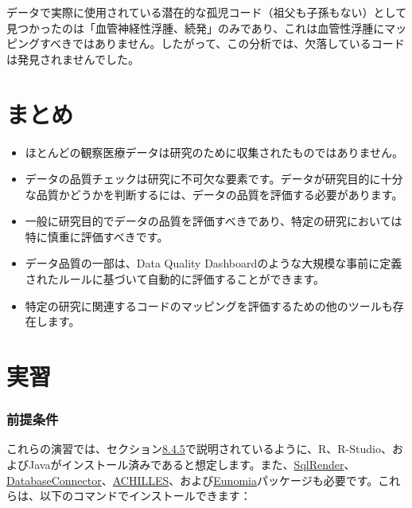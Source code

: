 \documentclass[
  11pt]{book}
\makeatletter
\newenvironment{kframe}{%
\medskip{}
\setlength{\fboxsep}{.8em}
 \def\at@end@of@kframe{}%
 \ifinner\ifhmode%
  \def\at@end@of@kframe{\end{minipage}}%
  \begin{minipage}{\columnwidth}%
 \fi\fi%
 \def\FrameCommand##1{\hskip\@totalleftmargin \hskip-\fboxsep
 \colorbox{myShadeColor}{##1}\hskip-\fboxsep
     \hskip-\linewidth \hskip-\@totalleftmargin \hskip\columnwidth}%
 \MakeFramed {\advance\hsize-\width
   \@totalleftmargin\z@ \linewidth\hsize
   \@setminipage}}%
 {\par\unskip\endMakeFramed%
 \at@end@of@kframe}
\newenvironment{rmdblock}[1]
  {
  \begin{itemize}
  \renewcommand{\labelitemi}{
    \raisebox{-.7\height}[0pt][0pt]{
      {\setkeys{Gin}{width=3em,keepaspectratio}\texttt{[image: images/\#1]}}
    }
  }
  \setlength{\fboxsep}{1em}
  \begin{kframe}
  \item
  }
  {
  \end{kframe}
  \end{itemize}
  }
\newenvironment{rmdsummary}
  {\begin{rmdblock}{summary}}
  {\end{rmdblock}}
\theoremstyle{definition}
\theoremstyle{definition}
\theoremstyle{definition}
\theoremstyle{definition}
\theoremstyle{remark}
\makeatother
\begin{document}
データで実際に使用されている潜在的な孤児コード（祖父も子孫もない）として見つかったのは「血管神経性浮腫、続発」のみであり、これは血管性浮腫にマッピングすべきではありません。したがって、この分析では、欠落しているコードは発見されませんでした。

\section{まとめ}\label{ux307eux3068ux3081-11}

\begin{rmdsummary}
\begin{itemize}
\item
  ほとんどの観察医療データは研究のために収集されたものではありません。
\item
  データの品質チェックは研究に不可欠な要素です。データが研究目的に十分な品質かどうかを判断するには、データの品質を評価する必要があります。
\item
  一般に研究目的でデータの品質を評価すべきであり、特定の研究においては特に慎重に評価すべきです。
\item
  データ品質の一部は、Data Quality Dashboardのような大規模な事前に定義されたルールに基づいて自動的に評価することができます。
\item
  特定の研究に関連するコードのマッピングを評価するための他のツールも存在します。
\end{itemize}
\end{rmdsummary}

\section{実習}\label{ux5b9fux7fd2}

\subsubsection*{前提条件}\label{ux524dux63d0ux6761ux4ef6-9}

これらの演習では、セクション\href{https://ohdsi.github.io/TheBookOfOhdsi/OhdsiAnalyticsTools.html\#installR}{8.4.5}で説明されているように、R、R-Studio、およびJavaがインストール済みであると想定します。また、\href{https://ohdsi.github.io/SqlRender/}{SqlRender}、\href{https://ohdsi.github.io/DatabaseConnector/}{DatabaseConnector}、\href{https://github.com/OHDSI/Achilles}{ACHILLES}、および\href{https://ohdsi.github.io/Eunomia/}{Eunomia}パッケージも必要です。これらは、以下のコマンドでインストールできます：
\end{document}
